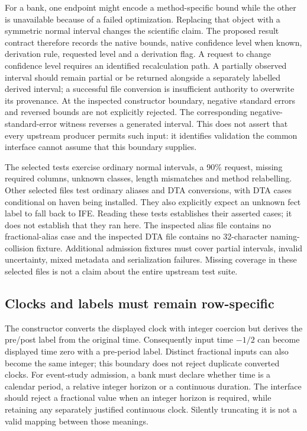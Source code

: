 For a bank, one endpoint might encode a method-specific bound while the other is unavailable because of a failed optimization. Replacing that object with a symmetric normal interval changes the scientific claim. The proposed result contract therefore records the native bounds, native confidence level when known, derivation rule, requested level and a derivation flag. A request to change confidence level requires an identified recalculation path. A partially observed interval should remain partial or be returned alongside a separately labelled derived interval; a successful file conversion is insufficient authority to overwrite its provenance. At the inspected constructor boundary, negative standard errors and reversed bounds are not explicitly rejected. The corresponding negative-standard-error witness reverses a generated interval. This does not assert that every upstream producer permits such input: it identifies validation the common interface cannot assume that this boundary supplies.~\citep{exec29_panel_inference_sources,exec29_panel_inference_reference}

The selected tests exercise ordinary normal intervals, a 90\% request, missing required columns, unknown classes, length mismatches and method relabelling. Other selected files test ordinary aliases and DTA conversions, with DTA cases conditional on haven being installed. They also explicitly expect an unknown fect label to fall back to IFE. Reading these tests establishes their asserted cases; it does not establish that they ran here. The inspected alias file contains no fractional-alias case and the inspected DTA file contains no 32-character naming-collision fixture. Additional admission fixtures must cover partial intervals, invalid uncertainty, mixed metadata and serialization failures. Missing coverage in these selected files is not a claim about the entire upstream test suite.~\citep{exec29_panel_inference_sources}

\subsection{Clocks and labels must remain row-specific}

The constructor converts the displayed clock with integer coercion but derives the pre/post label from the original time. Consequently input time $-1/2$ can become displayed time zero with a pre-period label. Distinct fractional inputs can also become the same integer; this boundary does not reject duplicate converted clocks. For event-study admission, a bank must declare whether time is a calendar period, a relative integer horizon or a continuous duration. The interface should reject a fractional value when an integer horizon is required, while retaining any separately justified continuous clock. Silently truncating it is not a valid mapping between those meanings.~\citep{exec29_panel_inference_sources,exec29_panel_inference_reference}

